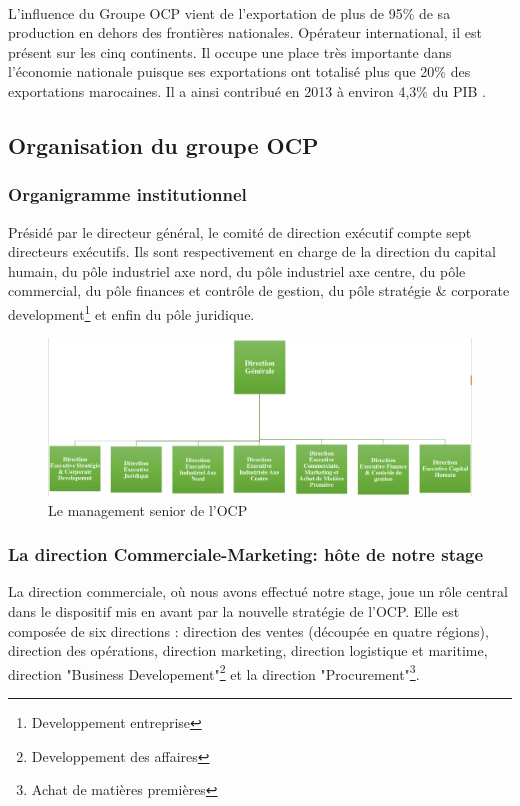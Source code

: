 		\paragraph{}
		L’influence du Groupe OCP vient de l’exportation de plus de 95\% de sa production en dehors
		des frontières nationales. Opérateur international, il est présent sur les cinq continents. Il occupe
		une place très importante dans l'économie nationale puisque ses exportations ont totalisé plus
		que 20\% des exportations marocaines. Il a ainsi contribué en 2013 à environ 4,3\% du PIB \cite{CHEMLAL}.
		\subsection{Organisation du groupe OCP}
		\subsubsection{Organigramme institutionnel}
		Présidé par le directeur général, le comité de direction exécutif compte sept directeurs exécutifs.
		Ils sont respectivement en charge de la direction du capital humain, du pôle industriel axe nord,
		du pôle industriel axe centre, du pôle commercial, du pôle finances et contrôle de gestion, du
		pôle stratégie \& corporate development\footnote{Developpement entreprise} et enfin du pôle juridique.
		\begin{figure}[H]
		    		\centering
		    		\includegraphics[scale=0.35]{Orga}
		    		\caption{Le management senior de l'OCP \cite{ocp-fil}}
		    		\label{fig:Orga}
			\end{figure}
		\subsubsection{La direction Commerciale-Marketing: hôte de notre stage}
		La direction commerciale, où nous avons effectué notre stage, joue un rôle central dans le dispositif mis
		en avant par la nouvelle stratégie de l'OCP. Elle est composée de six directions : direction des
		ventes (découpée en quatre régions), direction des opérations, direction marketing, direction
		logistique et maritime, direction "Business Developement"\footnote{Developpement des affaires} et la direction "Procurement"\footnote{Achat de matières
		premières}.
